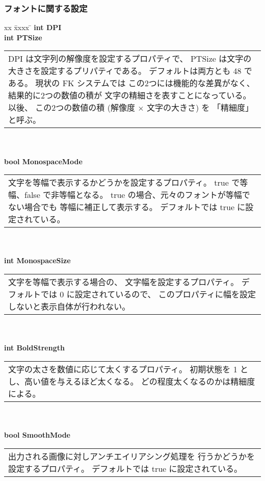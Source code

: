 \subsubsection{フォントに関する設定}
\begin{tabbing}
xx \= xxxx \= \kill
\> \textbf{int DPI} \\
\> \textbf{int PTSize} \\
	\> \> \begin{tabular}{p{15cm}}
		DPI は文字列の解像度を設定するプロパティで、
		PTSize は文字の大きさを設定するプリパティである。
		デフォルトは両方とも 48 である。
		現状の FK システムでは
		この2つには機能的な差異がなく、結果的に2つの数値の積が
		文字の精細さを表すことになっている。以後、
		この2つの数値の積 (解像度 \(\times\) 文字の大きさ) を
		「精細度」と呼ぶ。
	\end{tabular} \\ \\

\> \textbf{bool MonospaceMode} \\
	\> \> \begin{tabular}{p{15cm}}
		文字を等幅で表示するかどうかを設定するプロパティ。
		true で等幅、false で非等幅となる。
		true の場合、元々のフォントが等幅でない場合でも
		等幅に補正して表示する。
		デフォルトでは true に設定されている。
	\end{tabular} \\ \\

\> \textbf{int MonospaceSize} \\
	\> \> \begin{tabular}{p{15cm}}
		文字を等幅で表示する場合の、
		文字幅を設定するプロパティ。
		デフォルトでは 0 に設定されているので、
		このプロパティに幅を設定しないと表示自体が行われない。
	\end{tabular} \\ \\

\> \textbf{int BoldStrength} \\
	\> \> \begin{tabular}{p{15cm}}
		文字の太さを数値に応じて太くするプロパティ。
		初期状態を 1 とし、高い値を与えるほど太くなる。
		どの程度太くなるのかは精細度による。
	\end{tabular} \\ \\

\> \textbf{bool SmoothMode} \\
	\> \> \begin{tabular}{p{15cm}}
		出力される画像に対しアンチエイリアシング処理を
		行うかどうかを設定するプロパティ。
		デフォルトでは true に設定されている。
	\end{tabular} \\ \\


\end{tabbing}
